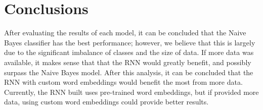 \documentclass{article}
\begin{document}
\section{Conclusions}{
  After evaluating the results of each model, it can be concluded that the Naive
  Bayes classifier has the best performance; however, we believe that this is
  largely due to the significant imbalance of classes and the size of data. If
  more data was available, it makes sense that that the RNN would greatly
  benefit, and possibly surpass the Naive Bayes model. After this analysis, it
  can be concluded that the RNN with custom word embeddings would benefit the
  most from more data. Currently, the RNN built uses pre-trained word
  embeddings, but if provided more data, using custom word embeddings could
  provide better results.
 }



\pagebreak
{}

\end{document}

